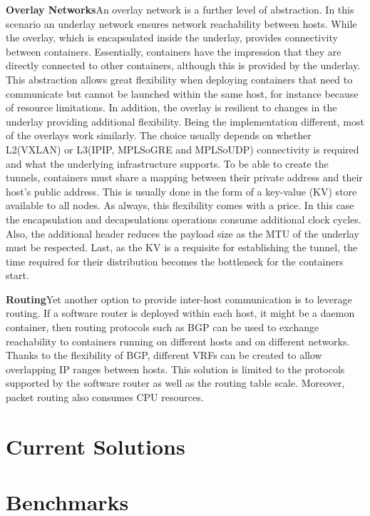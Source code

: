 \documentclass[conference]{IEEEtran}
\begin{document}
\noindent\textbf{Overlay Networks}\hspace{0.5cm}An overlay network is a further level of abstraction. In this scenario an underlay network ensures network reachability between hosts. While the overlay, which is encapsulated inside the underlay, provides connectivity between containers. Essentially, containers have the impression that they are directly connected to other containers, although this is provided by the underlay. This abstraction allows great flexibility when deploying containers that need to communicate but cannot be launched within the same host, for instance because of resource limitations. In addition, the overlay is resilient to changes in the underlay providing additional flexibility.
Being the implementation different, most of the overlays work similarly. The choice usually depends on whether L2(VXLAN) or L3(IPIP, MPLSoGRE and MPLSoUDP) connectivity is required and what the underlying infrastructure supports. To be able to create the tunnels, containers must share a mapping between their private address and their host's public address. This is usually done in the form of a key-value (KV) store available to all nodes. As always, this flexibility comes with a price. In this case the encapsulation and decapsulations operations consume additional clock cycles. Also, the additional header reduces the payload size as the MTU of the underlay must be respected. Last, as the KV is a requisite for establishing the tunnel, the time required for their distribution becomes the bottleneck for the containers start.

\noindent\textbf{Routing}\hspace{0.5cm}Yet another option to provide inter-host communication is to leverage routing. If a software router is deployed within each host, it might be a daemon container, then routing protocols such as BGP can be used to exchange reachability to containers running on different hosts and on different networks. Thanks to the flexibility of BGP, different VRFs can be created to allow overlapping IP ranges between hosts. This solution is limited to the protocols supported by the software router as well as the routing table scale. Moreover, packet routing also consumes CPU resources.

\section{Current Solutions}

\section{Benchmarks}
\end{document}
